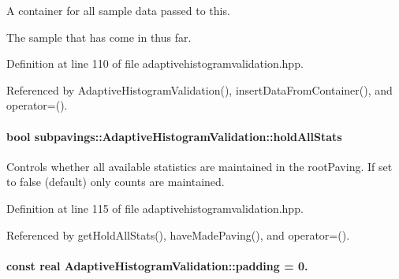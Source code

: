 \-A container for all sample data passed to this. 

\-The sample that has come in thus far. 

\-Definition at line 110 of file adaptivehistogramvalidation.\-hpp.



\-Referenced by \-Adaptive\-Histogram\-Validation(), insert\-Data\-From\-Container(), and operator=().

\hypertarget{classsubpavings_1_1AdaptiveHistogramValidation_a4de24d08db784df2fdb619ba2c1f62fd}{
\paragraph[{hold\-All\-Stats}]{\setlength{\rightskip}{0pt plus 5cm}bool {\bf subpavings\-::\-Adaptive\-Histogram\-Validation\-::hold\-All\-Stats}}}\label{classsubpavings_1_1AdaptiveHistogramValidation_a4de24d08db784df2fdb619ba2c1f62fd}


\-Controls whether all available statistics are maintained in the root\-Paving. \-If set to false (default) only counts are maintained. 



\-Definition at line 115 of file adaptivehistogramvalidation.\-hpp.



\-Referenced by get\-Hold\-All\-Stats(), have\-Made\-Paving(), and operator=().

\hypertarget{classsubpavings_1_1AdaptiveHistogramValidation_a0039bec0f033c35a5477375cb54eb8ea}{
\paragraph[{padding}]{\setlength{\rightskip}{0pt plus 5cm}const real {\bf \-Adaptive\-Histogram\-Validation\-::padding} = 0.}}\label{classsubpavings_1_1AdaptiveHistogramValidation_a0039bec0f033c35a5477375cb54eb8ea}



